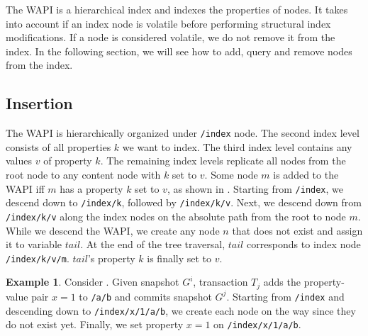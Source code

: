 \documentclass[abstracton,12pt]{scrartcl}
\theoremstyle{definition}
\newtheorem{example}{Example}
\begin{document}
The WAPI is a hierarchical index and indexes the properties of nodes.
It takes into account if an index node is volatile before performing structural index modifications.
If a node is considered volatile, we do not remove it from the index.
In the following section, we will see how to add, query and remove nodes from the index.

\subsection{Insertion}

The WAPI is hierarchically organized under \texttt{/index} node.
The second index level consists of all properties $k$ we want to index.
The third index level contains any values $v$ of property $k$.
The remaining index levels replicate all nodes from the root node to any content node with $k$ set to $v$.
Some node $m$ is added to the WAPI iff $m$ has a property $k$ set to $v$, as shown in .
Starting from \texttt{/index}, we descend down to \texttt{/index/k}, followed by \texttt{/index/k/v}.
Next, we descend down from \texttt{/index/k/v} along the index nodes on the absolute path from the root to node $m$.
While we descend the WAPI, we create any node $n$ that does not exist and assign it to variable $tail$.
At the end of the tree traversal, $tail$ corresponds to index node \texttt{/index/k/v/m}. 
$tail$'s property $k$ is finally set to $v$.

\begin{example}
    Consider .
    Given snapshot $G^i$, transaction $T_j$ adds the property-value pair $x=1$ to \texttt{/a/b} and commits snapshot $G^j$.
    Starting from \texttt{/index} and descending down to \texttt{/index/x/1/a/b}, we create each node on the way since they do not exist yet.
    Finally, we set property $x=1$ on \texttt{/index/x/1/a/b}.
\end{example}

\vspace{1.3cm}
\end{document}
